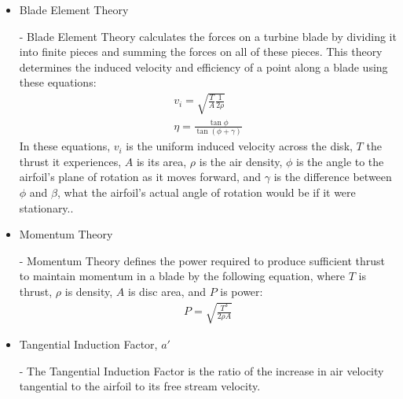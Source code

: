 \documentclass{article}
\begin{document}
\begin{itemize}
	\item \hypertarget{BET}{Blade Element Theory} - Blade Element Theory calculates the forces on a turbine blade by dividing it into finite pieces and summing the forces on all of these pieces. This theory determines the induced velocity and efficiency of a point along a blade using these equations:
	\begin{equation}
	\begin{aligned}
		v_{i} = \sqrt{\frac{T}{A} \frac{1}{2 \rho}} \\
        		\eta = \frac{\tan{\phi}}{\tan{(\phi + \gamma)}}
	\end{aligned}
	\end{equation}
In these equations, $v_{i}$ is the uniform induced velocity across the disk, $T$ the thrust it experiences, $A$ is its area, $\rho$ is the air density, $\phi$ is the angle to the airfoil's plane of rotation as it moves forward, and $\gamma$ is the difference between $\phi$ and $\beta$, what the airfoil's actual angle of rotation would be if it were stationary..
	
	\item \hypertarget{MT}{Momentum Theory} - Momentum Theory defines the power required to produce sufficient thrust to maintain momentum in a blade by the following equation, where $T$ is thrust, $\rho$ is density, $A$ is disc area, and $P$ is power:
	\begin{equation}
	\begin{aligned}
        		P = \sqrt{\frac{T^{3}}{2 \rho A}}
	\end{aligned}
	\end{equation}
	
	\item \hypertarget{a'}{Tangential Induction Factor, $a'$} - The Tangential Induction Factor is the ratio of the increase in air velocity tangential to the airfoil to its free stream velocity.
	
\end{itemize}
\end{document}
